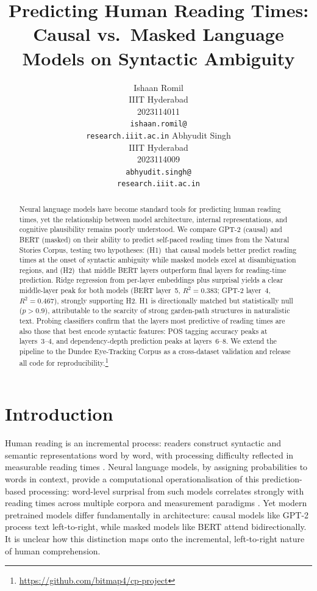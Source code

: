 \documentclass[11pt]{article}
\title{Predicting Human Reading Times:\\Causal vs.\ Masked Language Models on Syntactic Ambiguity}
\author{Ishaan Romil \\
  IIIT Hyderabad \\
  2023114011 \\
  \texttt{ishaan.romil@}\\
  \texttt{research.iiit.ac.in}
  \And
  Abhyudit Singh \\
  IIIT Hyderabad \\
  2023114009 \\
  \texttt{abhyudit.singh@}\\
  \texttt{research.iiit.ac.in}}
\begin{document}
\maketitle

\begin{abstract}
Neural language models have become standard tools for predicting human reading times, yet the relationship between model architecture, internal representations, and cognitive plausibility remains poorly understood.
We compare GPT-2 (causal) and BERT (masked) on their ability to predict self-paced reading times from the Natural Stories Corpus, testing two hypotheses: (H1)~that causal models better predict reading times at the onset of syntactic ambiguity while masked models excel at disambiguation regions, and (H2)~that middle BERT layers outperform final layers for reading-time prediction.
Ridge regression from per-layer embeddings plus surprisal yields a clear middle-layer peak for both models (BERT layer~5, $R^2{=}0.383$; GPT-2 layer~4, $R^2{=}0.467$), strongly supporting H2.
H1 is directionally matched but statistically null ($p{>}0.9$), attributable to the scarcity of strong garden-path structures in naturalistic text.
Probing classifiers confirm that the layers most predictive of reading times are also those that best encode syntactic features: POS tagging accuracy peaks at layers~3--4, and dependency-depth prediction peaks at layers~6--8.
We extend the pipeline to the Dundee Eye-Tracking Corpus as a cross-dataset validation and release all code for reproducibility.\footnote{\url{https://github.com/bitmap4/cp-project}}
\end{abstract}

\section{Introduction}

Human reading is an incremental process: readers construct syntactic and semantic representations word by word, with processing difficulty reflected in measurable reading times \citep{hale2001,smith2013}.
Neural language models, by assigning probabilities to words in context, provide a computational operationalisation of this prediction-based processing: word-level surprisal from such models correlates strongly with reading times across multiple corpora and measurement paradigms \citep{goodkind2018,wilcox2020}.
Yet modern pretrained models differ fundamentally in architecture: causal models like GPT-2 \citep{radford2019} process text left-to-right, while masked models like BERT \citep{devlin2019} attend bidirectionally. It is unclear how this distinction maps onto the incremental, left-to-right nature of human comprehension.
\end{document}
